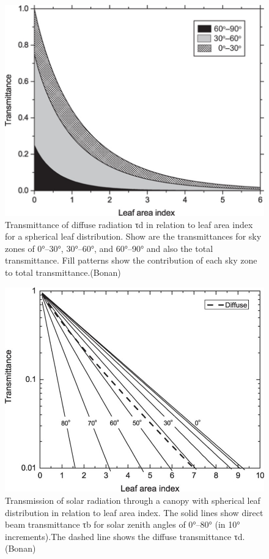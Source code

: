\documentclass[12pt,oneside]{book}
\begin{document}
\begin{figure}

{\centering \includegraphics[width=0.8\linewidth]{figures/chap3/f317_diff_trans} 

}

\caption{Transmittance of diffuse radiation τd in relation to leaf area index for a spherical leaf distribution. Show are the transmittances for sky zones of 0°–30°, 30°–60°, and 60°–90° and also the total transmittance. Fill patterns show the contribution of each sky zone to total transmittance.(Bonan)}\label{fig:f317}
\end{figure}

\begin{figure}

{\centering \includegraphics[width=0.8\linewidth]{figures/chap3/f318_diff_dir_trans} 

}

\caption{Transmission of solar radiation through a canopy with spherical leaf distribution in relation to leaf area index. The solid lines show direct beam transmittance τb for solar zenith angles of 0°–80° (in 10° increments).The dashed line shows the diffuse transmittance τd. (Bonan)}\label{fig:f318}
\end{figure}
\end{document}
